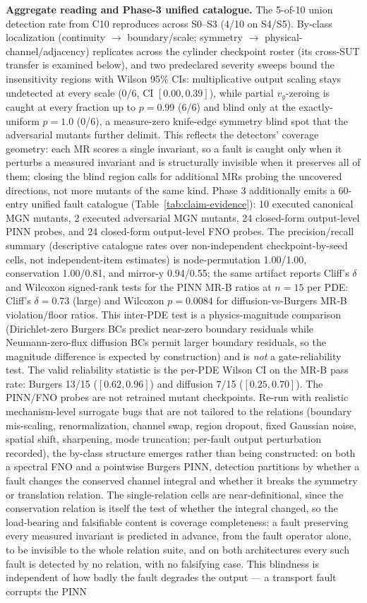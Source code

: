 \documentclass[preprint,12pt]{elsarticle}
\begin{document}
\textbf{Aggregate reading and Phase-3 unified catalogue.} The 5-of-10 union detection rate from C10 reproduces across S0--S3 (4/10 on S4/S5). By-class localization (continuity $\to$ boundary/scale; symmetry $\to$ physical-channel/adjacency) replicates across the cylinder checkpoint roster (its cross-SUT transfer is examined below), and two predeclared severity sweeps bound the insensitivity regions with Wilson 95\% CIs: multiplicative output scaling stays undetected at every scale (0/6, CI $[0.00, 0.39]$), while partial $v_y$-zeroing is caught at every fraction up to $p=0.99$ (6/6) and blind only at the exactly-uniform $p=1.0$ (0/6), a measure-zero knife-edge symmetry blind spot that the adversarial mutants further delimit. This reflects the detectors' coverage geometry: each MR scores a single invariant, so a fault is caught only when it perturbs a measured invariant and is structurally invisible when it preserves all of them; closing the blind region calls for additional MRs probing the uncovered directions, not more mutants of the same kind. Phase 3 additionally emits a 60-entry unified fault catalogue (Table~\ref{tab:claim-evidence}): 10 executed canonical MGN mutants, 2 executed adversarial MGN mutants, 24 closed-form output-level PINN probes, and 24 closed-form output-level FNO probes. The precision/recall summary (descriptive catalogue rates over non-independent checkpoint-by-seed cells, not independent-item estimates) is node-permutation 1.00/1.00, conservation 1.00/0.81, and mirror-y 0.94/0.55; the same artifact reports Cliff's $\delta$ and Wilcoxon signed-rank tests for the PINN MR-B ratios at $n=15$ per PDE: Cliff's $\delta=0.73$ (large) and Wilcoxon $p=0.0084$ for diffusion-vs-Burgers MR-B violation/floor ratios. This inter-PDE test is a physics-magnitude comparison (Dirichlet-zero Burgers BCs predict near-zero boundary residuals while Neumann-zero-flux diffusion BCs permit larger boundary residuals, so the magnitude difference is expected by construction) and is \emph{not} a gate-reliability test. The valid reliability statistic is the per-PDE Wilson CI on the MR-B pass rate: Burgers 13/15 ($[0.62, 0.96]$) and diffusion 7/15 ($[0.25, 0.70]$). The PINN/FNO probes are not retrained mutant checkpoints. Re-run with realistic mechanism-level surrogate bugs that are not tailored to the relations (boundary mis-scaling, renormalization, channel swap, region dropout, fixed Gaussian noise, spatial shift, sharpening, mode truncation; per-fault output perturbation recorded), the by-class structure emerges rather than being constructed: on both a spectral FNO and a pointwise Burgers PINN, detection partitions by whether a fault changes the conserved channel integral and whether it breaks the symmetry or translation relation. The single-relation cells are near-definitional, since the conservation relation is itself the test of whether the integral changed, so the load-bearing and falsifiable content is coverage completeness: a fault preserving every measured invariant is predicted in advance, from the fault operator alone, to be invisible to the whole relation suite, and on both architectures every such fault is detected by no relation, with no falsifying case. This blindness is independent of how badly the fault degrades the output --- a transport fault corrupts the PINN 
\end{document}
